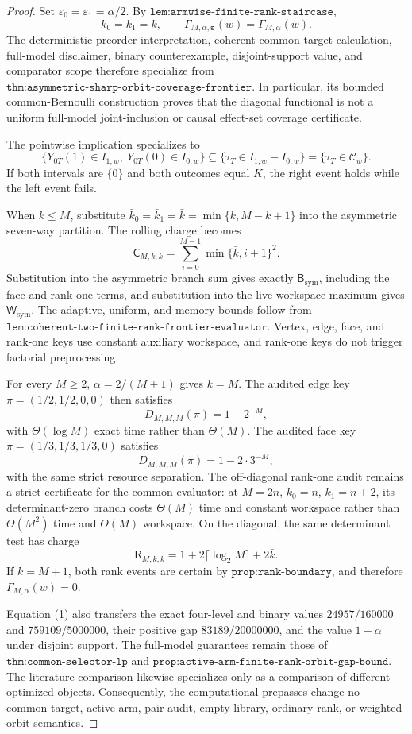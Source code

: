\documentclass{article}
\begin{document}
\begin{proof}
Set \(\varepsilon_0=\varepsilon_1=\alpha/2\). By \(\texttt{lem:armwise-finite-rank-staircase}\),
\[
k_0=k_1=k,\qquad \Gamma_{M,\alpha,\boldsymbol\varepsilon}(w)=\Gamma_{M,\alpha}(w).
\tag{1}
\]
The deterministic-preorder interpretation, coherent common-target calculation, full-model disclaimer, binary counterexample, disjoint-support value, and comparator scope therefore specialize from \(\texttt{thm:asymmetric-sharp-orbit-coverage-frontier}\). In particular, its bounded common-Bernoulli construction proves that the diagonal functional is not a uniform full-model joint-inclusion or causal effect-set coverage certificate.

The pointwise implication specializes to
\[
\{Y_{0T}(1)\in I_{1,w},\ Y_{0T}(0)\in I_{0,w}\}\subseteq\{\tau_T\in I_{1,w}-I_{0,w}\}=\{\tau_T\in\mathcal C_w\}.
\tag{2}
\]
If both intervals are \(\{0\}\) and both outcomes equal \(K\), the right event holds while the left event fails.

When \(k\le M\), substitute \(\bar k_0=\bar k_1=\bar k=\min\{k,M-k+1\}\) into the asymmetric seven-way partition. The rolling charge becomes
\[
\mathsf C_{M,k,k}=\sum_{i=0}^{M-1}\min\{\bar k,i+1\}^2.
\tag{3}
\]
Substitution into the asymmetric branch sum gives exactly \(\mathsf B_{\mathrm{sym}}\), including the face and rank-one terms, and substitution into the live-workspace maximum gives \(\mathsf W_{\mathrm{sym}}\). The adaptive, uniform, and memory bounds follow from \(\texttt{lem:coherent-two-finite-rank-frontier-evaluator}\). Vertex, edge, face, and rank-one keys use constant auxiliary workspace, and rank-one keys do not trigger factorial preprocessing.

For every \(M\ge2\), \(\alpha=2/(M+1)\) gives \(k=M\). The audited edge key \(\pi=(1/2,1/2,0,0)\) then satisfies
\[
D_{M,M,M}(\pi)=1-2^{-M},
\tag{4}
\]
with \(\Theta(\log M)\) exact time rather than \(\Theta(M)\). The audited face key \(\pi=(1/3,1/3,1/3,0)\) satisfies
\[
D_{M,M,M}(\pi)=1-2\cdot3^{-M},
\tag{5}
\]
with the same strict resource separation. The off-diagonal rank-one audit remains a strict certificate for the common evaluator: at \(M=2n\), \(k_0=n\), \(k_1=n+2\), its determinant-zero branch costs \(\Theta(M)\) time and constant workspace rather than \(\Theta(M^2)\) time and \(\Theta(M)\) workspace. On the diagonal, the same determinant test has charge
\[
\mathsf R_{M,k,k}=1+2\lceil\log_2M\rceil+2\bar k.
\tag{6}
\]
If \(k=M+1\), both rank events are certain by \(\texttt{prop:rank-boundary}\), and therefore \(\Gamma_{M,\alpha}(w)=0\).

Equation (1) also transfers the exact four-level and binary values \(24957/160000\) and \(759109/5000000\), their positive gap \(83189/20000000\), and the value \(1-\alpha\) under disjoint support. The full-model guarantees remain those of \(\texttt{thm:common-selector-lp}\) and \(\texttt{prop:active-arm-finite-rank-orbit-gap-bound}\). The literature comparison likewise specializes only as a comparison of different optimized objects. Consequently, the computational prepasses change no common-target, active-arm, pair-audit, empty-library, ordinary-rank, or weighted-orbit semantics.
\end{proof}
\end{document}
